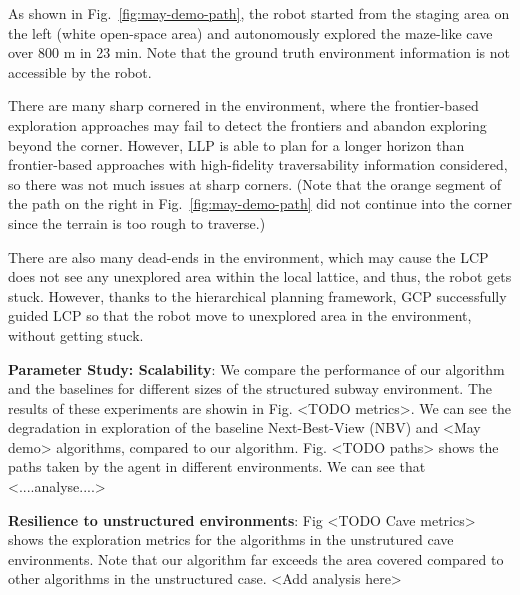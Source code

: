 \documentclass[letterpaper]{article} %
\newcommand{\ph}[1]{{\textbf{#1}:}} %
\begin{document}

As shown in Fig.~\ref{fig:may-demo-path}, the robot started from the staging area on the left (white open-space area) and autonomously explored the maze-like cave over 800 m in 23 min.
Note that the ground truth environment information is not accessible by the robot.

There are many sharp cornered in the environment, where the frontier-based exploration approaches may fail to detect the frontiers and abandon exploring beyond the corner.
However, LLP is able to plan for a longer horizon than frontier-based approaches with high-fidelity traversability information considered, so there was not much issues at sharp corners.
(Note that the orange segment of the path on the right in Fig.~\ref{fig:may-demo-path} did not continue into the corner since the terrain is too rough to traverse.)

There are also many dead-ends in the environment, which may cause the LCP does not see any unexplored area within the local lattice, and thus, the robot gets stuck.
However, thanks to the hierarchical planning framework, GCP successfully guided LCP so that the robot move to unexplored area in the environment, without getting stuck.

\ph{Parameter Study: Scalability}
We compare the performance of our algorithm and the baselines for different sizes of the structured subway environment. The results of these experiments are showin in Fig. <TODO metrics>. We can see the degradation in exploration of the baseline Next-Best-View (NBV) and <May demo> algorithms, compared to our algorithm. Fig. <TODO paths> shows the paths taken by the agent in different environments. We can see that <....analyse....>

\ph{Resilience to unstructured environments}
Fig <TODO Cave metrics> shows the exploration metrics for the algorithms in the unstrutured cave environments. Note that our algorithm far exceeds the area covered compared to other algorithms in the unstructured case. <Add analysis here>
\end{document}
